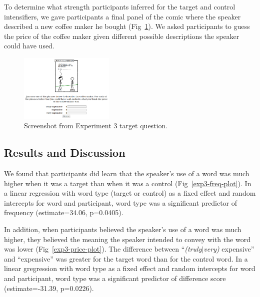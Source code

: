 \documentclass[10pt,letterpaper]{article}
\begin{document}
To determine what strength participants inferred for the target and control intensifiers, we gave participants a final panel of the comic where the speaker described a new coffee maker he bought (Fig~\ref{exp3-q}). We asked participants to guess the price of the coffee maker given different possible descriptions the speaker could have used.

\begin{figure}[ht]
\begin{center}
\includegraphics[width=0.4\textwidth]{analysis_files_for_writeup/images/exp3-q.png}
\end{center}
\caption{Screenshot from Experiment 3 target question.} 
\label{exp3-q}
\end{figure}

\subsection{Results and Discussion}



We found that participants did learn that the speaker's use of a word was much higher when it was a target than when it was a control (Fig~\ref{exp3-freq-plot}). In a linear regression with word type (target or control) as a fixed effect and random intercepts for word and participant, word type was a significant predictor of frequency (estimate=34.06, p=0.0405).

In addition, when participants believed the speaker's use of a word was much higher, they believed the meaning the speaker intended to convey with the word was lower (Fig~\ref{exp3-price-plot}). The difference between ``\emph{(truly$|$very)} expensive'' and ``expensive'' was greater for the target word than for the control word. In a linear gregression with word type as a fixed effect and random intercepts for word and participant, word type was a significant predictor of difference score (estimate=-31.39, p=0.0226).
\end{document}
